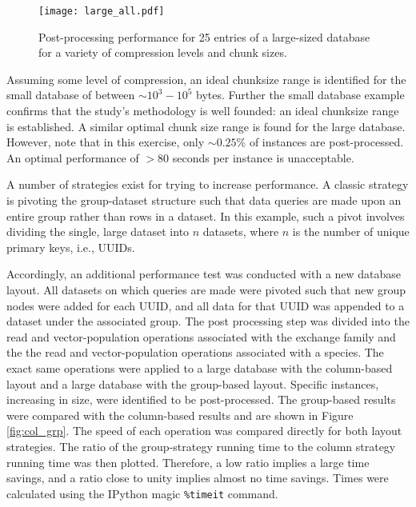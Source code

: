 \begin{figure}
  \begin{center}
    \texttt{[image: large\_all.pdf]}
    \caption{
      \label{fig:large_db}
      Post-processing performance for 25 entries of a large-sized database for a
      variety of compression levels and chunk sizes.}
  \end{center}
\end{figure}

Assuming some level of compression, an ideal chunksize range is identified for
the small database of between $\sim 10^3 - 10^5$ bytes. Further the small
database example confirms that the study's methodology is well founded: an ideal
chunksize range is established. A similar optimal chunk size range is found for
the large database. However, note that in this exercise, only $\sim 0.25\%$ of
instances are post-processed. An optimal performance of $> 80$ seconds per
instance is unacceptable.

A number of strategies exist for trying to increase performance. A classic
strategy is pivoting the group-dataset structure such that data queries are made
upon an entire group rather than rows in a dataset. In this example, such a
pivot involves dividing the single, large dataset into $n$ datasets, where $n$
is the number of unique primary keys, i.e., UUIDs.

Accordingly, an additional performance test was conducted with a new database
layout. All datasets on which queries are made were pivoted such that new group
nodes were added for each UUID, and all data for that UUID was appended to a
dataset under the associated group. The post processing step was divided into
the read and vector-population operations associated with the exchange family
and the the read and vector-population operations associated with a species. The
exact same operations were applied to a large database with the column-based
layout and a large database with the group-based layout. Specific instances,
increasing in size, were identified to be post-processed. The group-based results
were compared with the column-based results and are shown in Figure
\ref{fig:col_grp}. The speed of each operation was compared directly for both
layout strategies. The ratio of the group-strategy running time to the column
strategy running time was then plotted. Therefore, a low ratio implies a large
time savings, and a ratio close to unity implies almost no time savings. Times
were calculated using the IPython magic \texttt{\%timeit} command.

